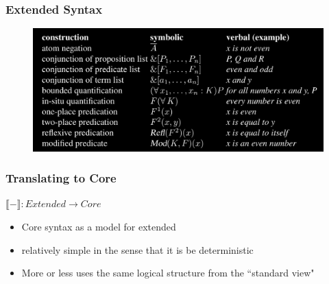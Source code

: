 \documentclass[9pt]{beamer}
\begin{document}
\begin{frame}
\frametitle{Extended Syntax}

\begin{figure}
\hspace*{-3mm}%
   \includegraphics[width= \paperwidth]{e.png}
\end{figure}
\end{frame}


\begin{frame}
\frametitle{Translating to Core}
$\llbracket - \rrbracket : Extended \to Core$

\begin{itemize}
\item Core syntax as a model for extended
\item relatively simple in the sense that it is be deterministic
\item More or less uses the same logical structure from the ``standard view"
\end{itemize}
\end{frame}
\end{document}
